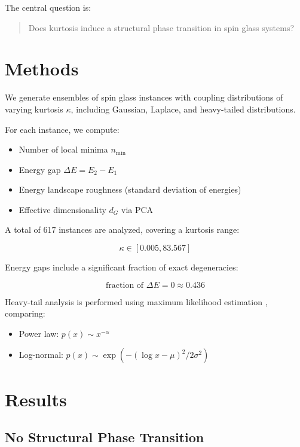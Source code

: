 \documentclass[11pt]{article}
\begin{document}
The central question is:

\begin{quote}
Does kurtosis induce a structural phase transition in spin glass systems?
\end{quote}

\section{Methods}

We generate ensembles of spin glass instances with coupling distributions of varying kurtosis $\kappa$, including Gaussian, Laplace, and heavy-tailed distributions.

For each instance, we compute:

\begin{itemize}
\item Number of local minima $n_{\min}$
\item Energy gap $\Delta E = E_2 - E_1$
\item Energy landscape roughness (standard deviation of energies)
\item Effective dimensionality $d_G$ via PCA
\end{itemize}

A total of 617 instances are analyzed, covering a kurtosis range:

\[
\kappa \in [0.005, 83.567]
\]

Energy gaps include a significant fraction of exact degeneracies:

\[
\text{fraction of } \Delta E = 0 \approx 0.436
\]

Heavy-tail analysis is performed using maximum likelihood estimation \citep{clauset2009power, newman2005power}, comparing:

\begin{itemize}
\item Power law: $p(x) \sim x^{-\alpha}$
\item Log-normal: $p(x) \sim \exp(-(\log x - \mu)^2 / 2\sigma^2)$
\end{itemize}

\section{Results}

\subsection{No Structural Phase Transition}
\end{document}
